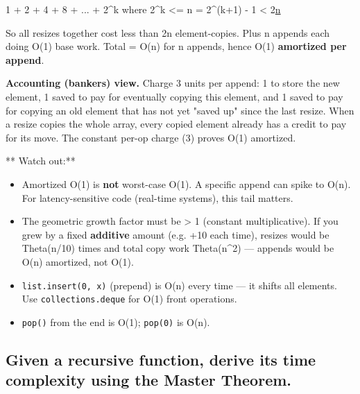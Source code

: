 \documentclass[11pt]{article}
\providecommand{\tightlist}{\setlength{\itemsep}{1pt}\setlength{\parskip}{0pt}}
\newenvironment{Shaded}{\begin{snugshade}}{\end{snugshade}}
\newcommand{\DecValTok}[1]{\textcolor[rgb]{0.96,0.45,0.00}{#1}}
\newcommand{\ErrorTok}[1]{\textcolor[rgb]{0.85,0.27,0.33}{\underline{#1}}}
\newcommand{\NormalTok}[1]{\textcolor[rgb]{0.81,0.81,0.76}{#1}}
\newcommand{\OperatorTok}[1]{\textcolor[rgb]{0.81,0.81,0.76}{#1}}
\begin{document}

\begin{Shaded}
\begin{Highlighting}[]
\DecValTok{1} \OperatorTok{+} \DecValTok{2} \OperatorTok{+} \DecValTok{4} \OperatorTok{+} \DecValTok{8} \OperatorTok{+}\NormalTok{ ... }\OperatorTok{+} \DecValTok{2}\OperatorTok{\^{}}\NormalTok{k   where }\DecValTok{2}\OperatorTok{\^{}}\NormalTok{k }\OperatorTok{\textless{}=}\NormalTok{ n}
\OperatorTok{=} \DecValTok{2}\OperatorTok{\^{}}\NormalTok{(k}\OperatorTok{+}\DecValTok{1}\NormalTok{) }\OperatorTok{{-}} \DecValTok{1}  \OperatorTok{\textless{}}  \DecValTok{2}\ErrorTok{n}
\end{Highlighting}
\end{Shaded}

So all resizes together cost less than 2n element-copies. Plus n appends each doing O(1) base work. Total = O(n) for n appends, hence O(1) \textbf{amortized per append}.

\textbf{Accounting (banker\textquotesingle s) view.} Charge 3 units per append: 1 to store the new element, 1 saved to pay for eventually copying this element, and 1 saved to pay for copying an old element that has not yet "saved up" since the last resize. When a resize copies the whole array, every copied element already has a credit to pay for its move. The constant per-op charge (3) proves O(1) amortized.

** Watch out:**

\begin{itemize}
\tightlist
\item
  Amortized O(1) is \textbf{not} worst-case O(1). A specific append can spike to O(n). For latency-sensitive code (real-time systems), this tail matters.
\item
  The geometric growth factor must be \textgreater{} 1 (constant multiplicative). If you grew by a fixed \textbf{additive} amount (e.g. +10 each time), resizes would be Theta(n/10) times and total copy work Theta(n\^{}2) --- appends would be O(n) amortized, not O(1).
\item
  \texttt{list.insert(0,\ x)} (prepend) is O(n) every time --- it shifts all elements. Use \texttt{collections.deque} for O(1) front operations.
\item
  \texttt{pop()} from the end is O(1); \texttt{pop(0)} is O(n).
\end{itemize}

\subsection{Given a recursive function, derive its time complexity using the Master Theorem.}\label{given-a-recursive-function-derive-its-time-complexity-using-the-master-theorem}
\end{document}
